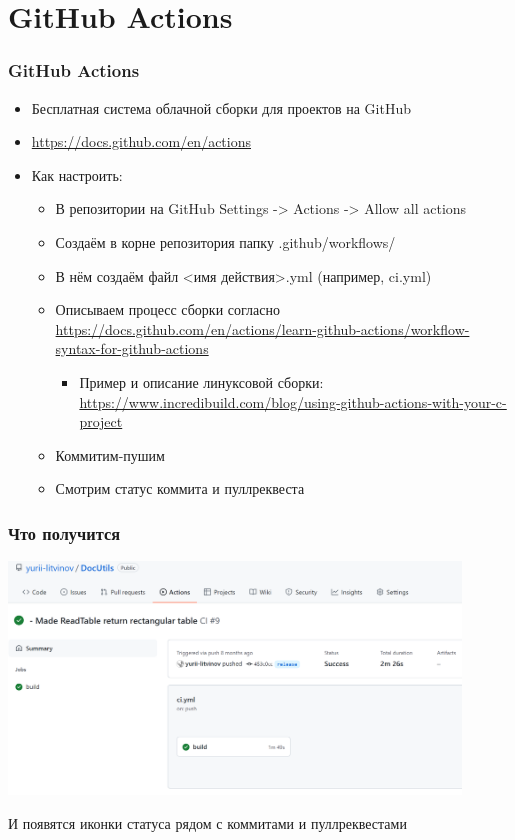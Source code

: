 \documentclass{../../slides-style}
\begin{document}
    \section{GitHub Actions}

    \begin{frame}
        \frametitle{GitHub Actions}
        \begin{itemize}
            \item Бесплатная система облачной сборки для проектов на GitHub
            \item \url{https://docs.github.com/en/actions}
            \item Как настроить:
            \begin{itemize}
                \item В репозитории на GitHub Settings -> Actions -> Allow all actions
                \item Создаём в корне репозитория папку .github/workflows/
                \item В нём создаём файл <имя действия>.yml (например, ci.yml)
                \item Описываем процесс сборки согласно \url{https://docs.github.com/en/actions/learn-github-actions/workflow-syntax-for-github-actions}
                \begin{itemize}
                    \item Пример и описание линуксовой сборки: \url{https://www.incredibuild.com/blog/using-github-actions-with-your-c-project}
                \end{itemize}
                \item Коммитим-пушим
                \item Смотрим статус коммита и пуллреквеста
            \end{itemize}
        \end{itemize}
    \end{frame}

    \begin{frame}
        \frametitle{Что получится}
        \begin{center}
            \includegraphics[width=0.9\textwidth]{githubActionsBuildStatus.png}
        \end{center}
        И появятся иконки статуса рядом с коммитами и пуллреквестами
    \end{frame}
\end{document}
